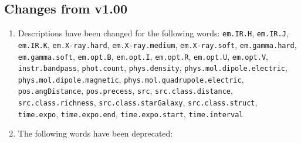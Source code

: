 \documentclass[11pt,a4paper]{ivoa}
\begin{document}
\subsection{Changes from v1.00}
\begin{enumerate}
\item Descriptions have been changed for the following words: {\tt em.IR.H}, {\tt em.IR.J}, 
{\tt em.IR.K}, {\tt em.X-ray.hard}, {\tt em.X-ray.medium}, {\tt em.X-ray.soft}, {\tt em.gamma.hard}, 
{\tt em.gamma.soft}, {\tt em.opt.B}, {\tt em.opt.I}, {\tt em.opt.R}, {\tt em.opt.U}, {\tt em.opt.V}, 
{\tt instr.bandpass}, {\tt phot.count}, {\tt phys.density}, {\tt phys.mol.dipole.electric}, 
{\tt phys.mol.dipole.magnetic}, {\tt phys.mol.quadrupole.electric}, {\tt pos.angDistance}, 
{\tt pos.precess}, {\tt src}, {\tt src.class.distance}, {\tt src.class.richness}, 
{\tt src.class.starGalaxy}, {\tt src.class.struct}, {\tt time.expo}, {\tt time.expo.end}, 
{\tt time.expo.start}, {\tt time.interval}
\item The following words have been deprecated: 


\end{enumerate}
\end{document}
